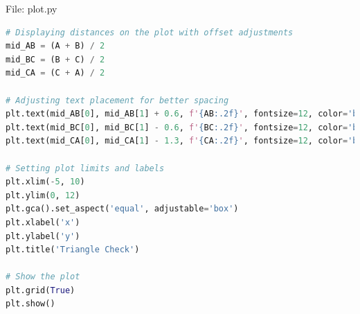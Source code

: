 \documentclass{beamer}
\numberwithin{equation}{section}
\theoremstyle{remark}
\begin{document}
\begin{frame}[fragile]{File: plot.py}
\begin{lstlisting}[language=Python]
# Displaying distances on the plot with offset adjustments
mid_AB = (A + B) / 2
mid_BC = (B + C) / 2
mid_CA = (C + A) / 2

# Adjusting text placement for better spacing
plt.text(mid_AB[0], mid_AB[1] + 0.6, f'{AB:.2f}', fontsize=12, color='blue', ha='center')
plt.text(mid_BC[0], mid_BC[1] - 0.6, f'{BC:.2f}', fontsize=12, color='blue', ha='center')
plt.text(mid_CA[0], mid_CA[1] - 1.3, f'{CA:.2f}', fontsize=12, color='blue', ha='center')

# Setting plot limits and labels
plt.xlim(-5, 10)
plt.ylim(0, 12)
plt.gca().set_aspect('equal', adjustable='box')
plt.xlabel('x')
plt.ylabel('y')
plt.title('Triangle Check')

# Show the plot
plt.grid(True)
plt.show()
\end{lstlisting}
\end{frame}
\end{document}
